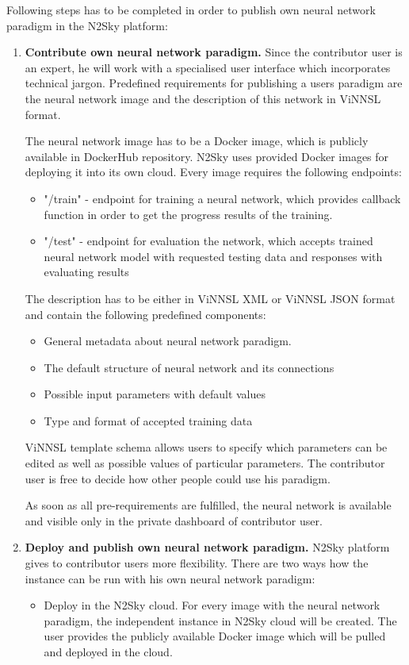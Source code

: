 \documentclass[conference]{IEEEtran}
\begin{document}
Following steps has to be completed in order to publish own neural network paradigm in the N2Sky platform:  
\begin{enumerate}
\item \textbf{Contribute own neural network paradigm.} Since the contributor user is an expert, he will work with a specialised user interface which incorporates technical jargon. Predefined requirements for publishing a users paradigm are the neural network image and the description of this network in ViNNSL format. 

The neural network image has to be a Docker image, which is publicly available in DockerHub repository. N2Sky uses provided Docker images for deploying it into its own cloud. Every image requires the following endpoints:
\begin{itemize}
\item "/train" - endpoint for training a neural network, which provides callback function in order to get the progress results of the training.
\item "/test" - endpoint for evaluation the network, which accepts trained neural network model with requested testing data and responses with evaluating results
\end{itemize}

The description has to be either in ViNNSL XML or ViNNSL JSON format and contain the following predefined components: 
\begin{itemize}
\item General metadata about neural network paradigm.
\item The default structure of neural network and its connections
\item Possible input parameters with default values
\item Type and format of accepted training data
\end{itemize}
ViNNSL template schema allows users to specify which parameters can be edited as well as possible values of particular parameters. The contributor user is free to decide how other people could use his paradigm.

As soon as all pre-requirements are fulfilled, the neural network is available and visible only in the private dashboard of contributor user. 

\item \textbf{Deploy and publish own neural network paradigm.} N2Sky platform gives to contributor users more flexibility. There are two ways how the instance can be run with his own neural network paradigm:
\begin{itemize}
\item Deploy in the N2Sky cloud. For every image with the neural network paradigm, the independent instance in N2Sky cloud will be created. The user provides the publicly available Docker image which will be pulled and deployed in the cloud. 


\end{itemize}
\end{enumerate}
\end{document}
